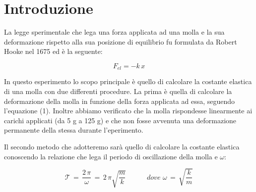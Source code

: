 \section{Introduzione}
La legge sperimentale che lega una forza applicata ad una molla e la sua deformazione rispetto alla sua posizione di equilibrio fu formulata da Robert Hooke nel 1675 ed è la seguente:

\begin{equation}
	F_{el} = -k\,x
	\label{hooke}
\end{equation}

In questo esperimento lo scopo principale è quello di calcolare la costante elastica di una molla con due differenti procedure.
La prima è quella di calcolare la deformazione della molla in funzione della forza applicata ad essa, seguendo l'equazione (1). Inoltre abbiamo verificato che la molla rispondesse linearmente ai carichi applicati (da 5 g a 125 g) e che non fosse avvenuta una deformazione permanente della stessa durante l'eperimento.

Il secondo metodo che adotteremo sarà quello di calcolare la costante elastica conoscendo la relazione che lega il periodo di oscillazione della molla e $\omega$:

\begin{equation}
	\mathcal{T} \,=\, \frac{2\,\pi}{\omega} \,=\, {2\,\pi}{\sqrt{\frac{m}{k}}} \quad\quad\quad dove \,\,  \omega \,=\, \sqrt{\frac{k}{m}}
\end{equation}